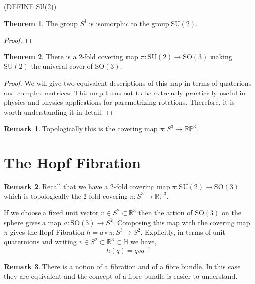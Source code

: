 \documentclass[12pt]{extarticle}
\newcommand{\R}{\mathbb{R}}
\newcommand{\rp}{\mathbb{RP}}
\theoremstyle{definition}
\newtheorem{theorem}{Theorem}[section]
\newtheorem{remark}{Remark}
\newenvironment{definition}[1][Definition:]{\begin{trivlist}
\item[\hskip \labelsep {\bfseries #1}]}{\end{trivlist}}
\newcommand{\SO}[1]{\mathrm{SO}\left(#1\right)}
\newcommand{\SU}[1]{\mathrm{SU}\left(#1\right)}
\renewcommand{\H}{\mathbb{H}}
\begin{document}
{(DEFINE SU(2))

\begin{theorem}
The group $S^3$ is isomorphic to the group $\SU{2}$. 
\end{theorem}

\begin{proof}

\end{proof}


\begin{theorem}
There is a 2-fold covering map $\pi : \SU{2} \to \SO{3}$ making $\SU{2}$ the univeral cover of $\SO{3}$. 
\end{theorem}

\begin{proof}
We will give two equivalent descriptions of this map in terms of quaterions and complex matrices. This map turns out to be extremely practically useful in physics and physics applications for parametrizing rotations. Therefore, it is worth understanding it in detail.
\end{proof}

\begin{remark}
Topologically this is the covering map $\pi : S^3 \to \mathbb{RP}^3$. 
\end{remark}
}


\section{The Hopf Fibration}

\begin{remark}
Recall that we have a 2-fold covering map $\pi : \SU{2} \to \SO{3}$ which is topologically the 2-fold covering $\pi : S^3 \to \rp^3$. 
\end{remark}

\begin{definition}
If we choose a fixed unit vector $v \in S^2 \subset \R^3$ then the action of $\SO{3}$ on the sphere gives a map $a : \SO{3} \to S^2$. Composing this map with the covering map $\pi$ gives the Hopf Fibration $h = a \circ \pi : S^3 \to S^2$. Explicitly, in terms of unit quaternions and writing $v \in S^2 \subset \R^3 \subset \H$ we have,
\[ h(q) = q v q^{-1} \]
\end{definition}

\begin{remark}
There is a notion of a fibration and of a fibre bundle. In this case they are equivalent and the concept of a fibre bundle is easier to understand.
\end{remark}
\end{document}
